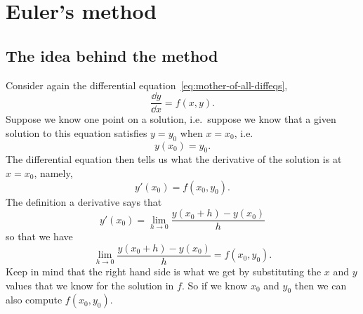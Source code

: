\section{Euler's method} %
\label{sec:eulers-method}
\subsection{The idea behind the method} %
Consider again the differential equation~\eqref{eq:mother-of-all-diffeqs},
\[
\frac{\dd y} {\dd x} = f(x, y).
\]
Suppose we know one point on a solution, i.e.~suppose we know that a given solution
to this equation satisfies $y=y_0$ when $x=x_0$, i.e.
\begin{equation}
  y(x_0) = y_0.
  \label{eq:initial-data}
\end{equation}
The differential equation then tells us what the derivative of the solution is at
$x=x_0$, namely,
\[
y'(x_0) = f(x_0, y_0).
\]
The definition a derivative says that
\[
y'(x_0) =\lim_{h\to 0} \frac{y(x_0+h) - y(x_0)} {h}
\]
so that we have
\begin{equation}
  \lim_{h\to 0} \frac{y(x_0+h) - y(x_0)} {h}  = f(x_0, y_0).
  \label{eq:diffeq-euler-derivation}
\end{equation}
Keep in mind that the right hand side is what we get by substituting the $x$ and $y$
values that we know for the solution in $f$.  So if we know $x_0$ and $y_0$ then we
can also compute $f(x_0, y_0)$.

